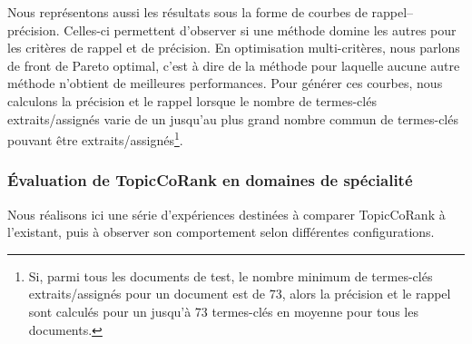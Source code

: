         Nous représentons aussi les résultats sous la forme de courbes de
        rappel--précision. Celles-ci permettent d'observer si une méthode domine
        les autres pour les critères de rappel et de précision. En optimisation
        multi-critères, nous parlons de front de Pareto optimal, c'est à dire de
        la méthode pour laquelle aucune autre méthode n'obtient de meilleures
        performances. Pour générer ces courbes, nous calculons la précision et
        le rappel lorsque  le nombre de termes-clés extraits/assignés varie de
        un jusqu'au plus grand nombre commun de termes-clés pouvant être
        extraits/assignés\footnote{Si, parmi tous les documents de test, le
        nombre minimum de termes-clés extraits/assignés pour un document est de
        73, alors la précision et le rappel sont calculés pour un jusqu'à 73
        termes-clés en moyenne pour tous les documents.}.
      
      \subsubsection{Évaluation de TopicCoRank en domaines de spécialité}
      \label{subsubsec:main-domain_specific_keyphrase_annotation-supervised_automatic_keyphrase_annotation-evaluation-topiccorank_specific_domains}
        Nous réalisons ici une série d'expériences destinées à comparer
        TopicCoRank à l'existant, puis à observer son comportement selon
        différentes configurations.


